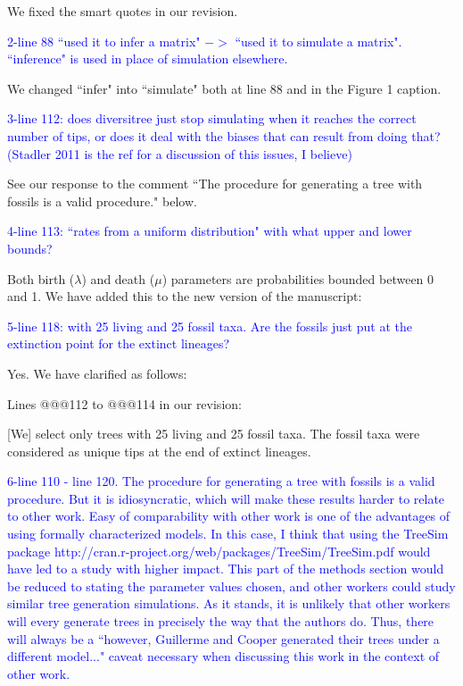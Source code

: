 \documentclass[11pt]{letter}
\begin{document}
\begin{letter}{}
We fixed the smart quotes in our revision.


\textcolor{blue}{2-line 88 ``used it to infer a matrix" $->$ ``used it to simulate a matrix". ``inference" is used in place of simulation elsewhere.}

We changed ``infer" into ``simulate" both at line 88 and in the Figure 1 caption.


\textcolor{blue}{3-line 112: does diversitree just stop simulating when it reaches the correct number of tips, or does it deal with the biases that can result from doing that? (Stadler 2011 is the ref for a discussion of this issues, I believe)}

See our response to the comment ``The procedure for generating a tree with fossils is a valid procedure." below.


\textcolor{blue}{4-line 113: ``rates from a uniform distribution" with what upper and lower bounds?}

Both birth ($\lambda$) and death ($\mu$) parameters are probabilities bounded between 0 and 1. We have added this to the new version of the manuscript:


\textcolor{blue}{5-line 118: with 25 living and 25 fossil taxa. Are the fossils just put at the extinction point for the extinct lineages?}

Yes. We have clarified as follows:

Lines @@@112 to @@@114 in our revision:

\hfill\begin{minipage}{\dimexpr\textwidth-1cm}
[We] select only trees with 25 living and 25 fossil taxa. The fossil taxa were considered as unique tips at the end of extinct lineages. %
\end{minipage}


\textcolor{blue}{6-line 110 - line 120. The procedure for generating a tree with fossils is a valid procedure. But it is idiosyncratic, which will make these results harder to relate to other work. Easy of comparability with other work is one of the advantages of using formally characterized models. In this case, I think that using the TreeSim package http://cran.r-project.org/web/packages/TreeSim/TreeSim.pdf would have led to a study with higher impact. This part of the methods section would be reduced to stating the parameter values chosen, and other workers could study similar tree generation simulations. As it stands, it is unlikely that other workers will every generate trees in precisely the way that the authors do. Thus, there will always be a ``however, Guillerme and Cooper generated their trees under a different model..." caveat necessary when discussing this work in the context of other work.}


\end{letter}
\end{document}
